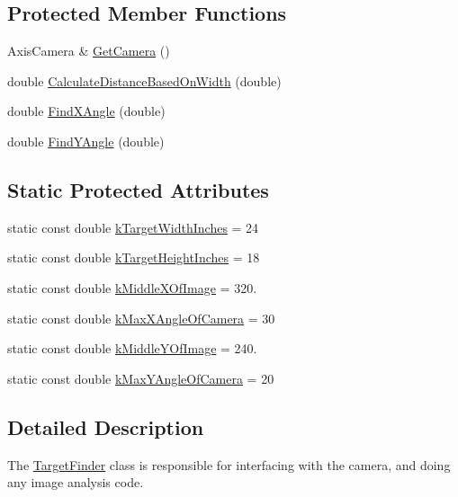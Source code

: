 \subsection*{\-Protected \-Member \-Functions}
\begin{DoxyCompactItemize}
\item 
\-Axis\-Camera \& \hyperlink{class_target_finder_a454435f7197d5dfb6ed9ee7d209cf453}{\-Get\-Camera} ()
\item 
double \hyperlink{class_target_finder_a0ea376b02d360a6bb588b8b46868fe62}{\-Calculate\-Distance\-Based\-On\-Width} (double)
\item 
double \hyperlink{class_target_finder_afdafb2b37f609d1be28817f1d389053d}{\-Find\-X\-Angle} (double)
\item 
double \hyperlink{class_target_finder_abc6ce74f0e24ed2c2c6ad5c7a64dee4a}{\-Find\-Y\-Angle} (double)
\end{DoxyCompactItemize}
\subsection*{\-Static \-Protected \-Attributes}
\begin{DoxyCompactItemize}
\item 
static const double \hyperlink{class_target_finder_adc3ffcb09c3ccede2d80a9a660022323}{k\-Target\-Width\-Inches} = 24
\item 
static const double \hyperlink{class_target_finder_a023ae61af8bc95bab208897f7a035feb}{k\-Target\-Height\-Inches} = 18
\item 
static const double \hyperlink{class_target_finder_afa127cfbab82be45bf01c46ec74c9547}{k\-Middle\-X\-Of\-Image} = 320.
\item 
static const double \hyperlink{class_target_finder_a8554e37a04baef4b6de1ad4862fedaa9}{k\-Max\-X\-Angle\-Of\-Camera} = 30
\item 
static const double \hyperlink{class_target_finder_a273e3b83a52d704c964bccf2e56bb667}{k\-Middle\-Y\-Of\-Image} = 240.
\item 
static const double \hyperlink{class_target_finder_a36262ebbb035a2e459661fc8ce20bdcd}{k\-Max\-Y\-Angle\-Of\-Camera} = 20
\end{DoxyCompactItemize}


\subsection{\-Detailed \-Description}
\-The \hyperlink{class_target_finder}{\-Target\-Finder} class is responsible for interfacing with the camera, and doing any image analysis code.

